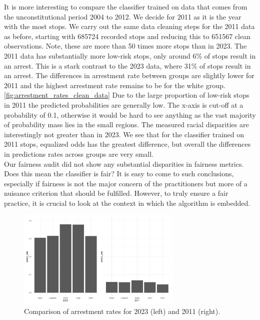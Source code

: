 It is more interesting to compare the classifier trained on data that comes from the unconstitutional period 2004 to 2012. We decide for 2011 as it is the year with the most stops.
We carry out the same data cleaning steps for the 2011 data as before, starting with 685724 recorded stops and reducing this to 651567 clean observations. Note, these are more than 50 times more stops than in 2023.
The 2011 data has substantially more low-risk stops, only around 6\% of stops result in an arrest. This is a stark contrast to the 2023 data, where 31\% of stops result in an arrest.
The differences in arrestment rate between groups are slightly lower for 2011 and the highest arrestment rate remains to be for the white group. \autoref{fig:arrestment_rates_clean_data}
Due to the large proportion of low-risk stops in 2011 the predicted probabilities are generally low. The x-axis is cut-off at a probability of 0.1, otherwise it would be hard to see anything as the vast majority of probability mass lies in the small regions.
The measured racial disparities are interestingly not greater than in 2023. We see that for the classifier trained on 2011 stops, equalized odds has the greatest difference, but overall the differences in predictions rates across groups are very small. \\ 
Our fairness audit did not show any substantial disparities in fairness metrics. Does this mean the classifier is fair?
It is easy to come to such conclusions, especially if fairness is not the major concern of the practitioners but more of a nuisance criterion that should be fulfilled. However, to truly ensure a fair practice, it is crucial to look at the context in which the algorithm is embedded.

\begin{figure}
    \centering
    \includegraphics[width=0.7\textwidth]{../figures/sqf_case_study_plot10.png}
    \caption{Comparison of arrestment rates for 2023 (left) and 2011 (right).}
    \label{fig:arrestment_rates_clean_data}
\end{figure}

